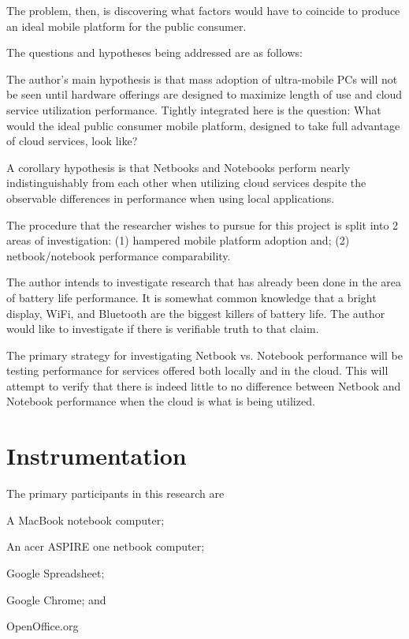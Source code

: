 The problem, then, is discovering what factors would have to coincide to produce
an ideal mobile platform for the public consumer.

The questions and hypotheses being addressed are as follows: 
\begin{inparaenum}[(1)]
  \item The author's main hypothesis is that mass adoption of ultra-mobile PCs
    will not be seen until hardware offerings are designed to maximize length of
    use and cloud service utilization performance.  Tightly integrated here is
    the question: What would the ideal public consumer mobile platform, designed
    to take full advantage of cloud services, look like?
  \item A corollary hypothesis is that Netbooks and Notebooks perform nearly
    indistinguishably from each other when utilizing cloud services despite the
    observable differences in performance when using local applications.
\end{inparaenum}

The procedure that the researcher wishes to pursue for this project is split
into 2 areas of investigation: (1) hampered mobile platform adoption and; (2)
netbook/notebook performance comparability.

The author intends to investigate research that has already been done in the
area of battery life performance.  It is somewhat common knowledge that a bright
display, WiFi, and Bluetooth are the biggest killers of battery life.  The
author would like to investigate if there is verifiable truth to that claim.

The primary strategy for investigating Netbook vs. Notebook performance will be
testing performance for services offered both locally and in the cloud.  This
will attempt to verify that there is indeed little to no difference between
Netbook and Notebook performance when the cloud is what is being utilized.

\section{Instrumentation}


The primary participants in this research are 
\begin{inparaenum}[(1)]
\item A MacBook notebook computer;
\item An acer ASPIRE one netbook computer;
\item Google Spreadsheet;
\item Google Chrome; and
\item OpenOffice.org
\end{inparaenum}

